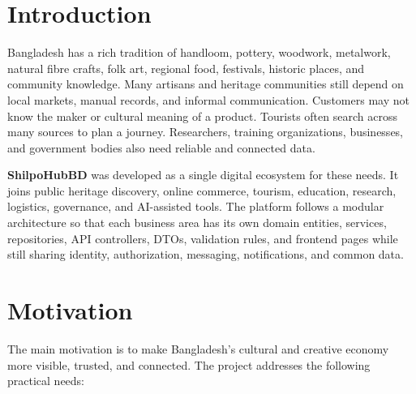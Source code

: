 \documentclass[12pt,a4paper]{report}
\newcommand{\projectname}{\textbf{ShilpoHubBD}}
\begin{document}
\clearpage
{}

\chapter{Introduction}

Bangladesh has a rich tradition of handloom, pottery, woodwork, metalwork, natural fibre crafts, folk art, regional food, festivals, historic places, and community knowledge. Many artisans and heritage communities still depend on local markets, manual records, and informal communication. Customers may not know the maker or cultural meaning of a product. Tourists often search across many sources to plan a journey. Researchers, training organizations, businesses, and government bodies also need reliable and connected data.

\projectname{} was developed as a single digital ecosystem for these needs. It joins public heritage discovery, online commerce, tourism, education, research, logistics, governance, and AI-assisted tools. The platform follows a modular architecture so that each business area has its own domain entities, services, repositories, API controllers, DTOs, validation rules, and frontend pages while still sharing identity, authorization, messaging, notifications, and common data.

\chapter{Motivation}

The main motivation is to make Bangladesh's cultural and creative economy more visible, trusted, and connected. The project addresses the following practical needs:
\end{document}
